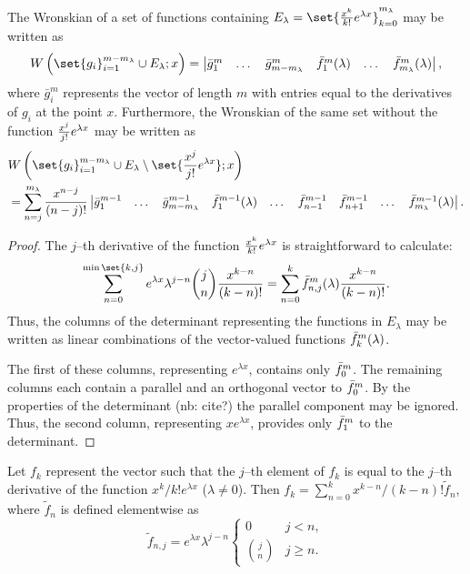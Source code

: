 \documentclass{book}
\begin{document}
\begin{lemma}
The Wronskian of a set of functions containing $E_\lambda = \set{\Poly{k} e^{\lambda x}}_{k=0}^{m_\lambda}$ may be written as
\begin{equation*}
\W{ \set{g_i}_{i=1}^{m - m_\lambda} \cup E_\lambda }{x} = \begin{vmatrix} \bar{g}^m_1 & \dots & \bar{g}^m_{m - m_\lambda} & \fmn{1}{m}(\lambda) & \dots & \fmn{m_\lambda}{m}(\lambda) \end{vmatrix} ,
\end{equation*}
where $\bar{g}_i^m$ represents the vector of length $m$ with entries equal to the derivatives of $g_i$ at the point $x$.
Furthermore, the Wronskian of the same set without the function $\Poly{j} e^{\lambda x}$ may be written as
\begin{align*}
& \W{ \set{g_i}_{i=1}^{m - m_\lambda} \cup E_\lambda \setminus \set{\Poly{j} e^{\lambda x}}}{x} \\
& = \sum_{n=j}^{m_\lambda} \poly{n-j} \begin{vmatrix} \bar{g}^{m-1}_1 & \dots & \bar{g}^{m-1}_{m - m_\lambda} & \fmn{1}{m-1}(\lambda) & \dots & \fmn{n-1}{m-1} & \fmn{n+1}{m-1} & \dots & \fmn{m_\lambda}{m-1}(\lambda) \end{vmatrix} .
\end{align*}
\end{lemma}

\begin{proof}
The $j$--th derivative of the function $\Poly{k} e^{\lambda x}$ is straightforward to calculate:
\begin{equation*}
\sum_{n=0}^{\min \set{k,j}} e^{\lambda x} \lambda^{j-n} \binom{j}{n} \poly{k-n} = \sum_{n=0}^k \fmn{n,j}{m}(\lambda) \poly{k-n}.
\end{equation*}
Thus, the columns of the determinant representing the functions in $E_\lambda$ may be written as linear combinations of the vector-valued functions $\fmn{k}{m}(\lambda)$.

The first of these columns, representing $e^{\lambda x}$, contains only $\fmn{0}{m}$.
The remaining columns each contain a parallel and an orthogonal vector to $\fmn{0}{m}$.
By the properties of the determinant (nb: cite?) the parallel component may be ignored.
Thus, the second column, representing $x e^{\lambda x}$, provides only $\fmn{1}{m}$ to the determinant.
\end{proof}

\begin{lemma}
Let $f_k$ represent the vector such that the $j$--th element of $f_k$ is equal to the $j$--th derivative of the function $x^k/k! e^{\lambda x}$ ($\lambda \neq 0$).
Then $f_k = \sum_{n=0}^k x^{k-n}/(k-n)! \tilde{f}_n$, where $\tilde{f}_n$ is defined elementwise as
\begin{equation*}
\tilde{f}_{n,j} = e^{\lambda x} \lambda^{j-n} \begin{cases} 0 & j < n, \\ \binom{j}{n} & j \geq n . \end{cases}
\end{equation*}
\label{lem:vec}
\end{lemma}
\end{document}
